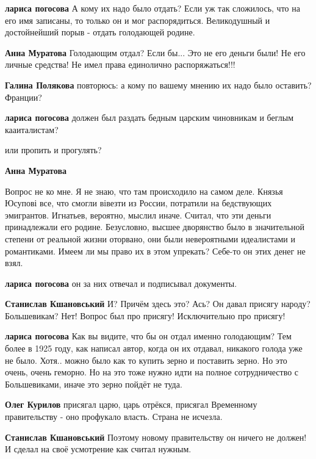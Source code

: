\begin{itemize}
\begin{itemize}
\begin{itemize}
\textbf{лариса погосова} А кому их надо было отдать? Если уж так сложилось, что на его имя записаны, то только он и мог распорядиться. Великодушный и достойнейший порыв - отдать голодающей родине.

\textbf{Анна Муратова}
Голодающим отдал?
Если бы...
Это не его деньги были!
Не его личные средства!
Не имел права единолично распоряжаться!!!

\textbf{Галина Полякова} повторюсь: а кому по вашему мнению их надо было оставить? Франции?

\textbf{лариса погосова} должен был раздать бедным царским чиновникам и беглым кааиталистам?

или пропить и прогулять?

\textbf{Анна Муратова} 

Вопрос не ко мне. Я не знаю, что там происходило на самом деле. Князья Юсупові
все, что смогли вівезти из России, потратили на бедствующих эмигрантов.
Игнатьев, вероятно, мыслил иначе. Считал, что эти деньги принадлежали его
родине. Безусловно, высшее дворянство было в значительной степени от реальной
жизни оторвано, они были невероятными идеалистами и романтиками. Имеем ли мы
право их в этом упрекать? Себе-то он этих денег не взял.


\textbf{лариса погосова} он за них отвечал и подписывал документы.

\textbf{Станислав Кшановський} И? Причём здесь это? Ась? Он давал присягу народу? Большевикам? Нет! Вопрос был про присягу! Исключительно про присягу!

\textbf{лариса погосова} Как вы видите, что бы он отдал именно голодающим? Тем более в 1925 году, как написал автор, когда он их отдавал, никакого голода уже не было. Хотя.. можно было как то купить зерно и поставить зерно. Но это очень, очень геморно. Но на это тоже нужно идти на полное сотрудничество с Большевиками, иначе это зерно пойдёт не туда.

\textbf{Олег Курилов} присягал царю, царь отрёкся, присягал Временному правительству - оно профукало власть. Страна не исчезла.

\textbf{Станислав Кшановський} Поэтому новому правительству он ничего не должен! И сделал на своё усмотрение как считал нужным.
\end{itemize} %


\end{itemize}
\end{itemize}
